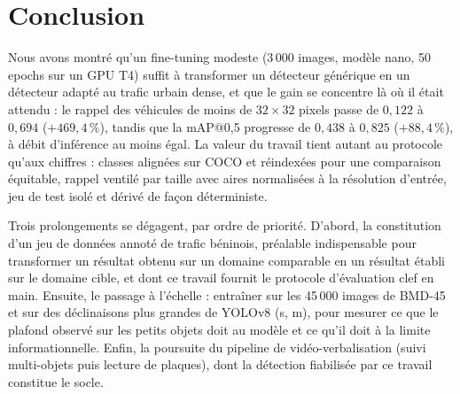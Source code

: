 \section{Conclusion}\label{sec-conclusion}

Nous avons montré qu'un fine-tuning modeste (3\,000 images, modèle
nano, 50 epochs sur un GPU T4) suffit à transformer un détecteur
générique en un détecteur adapté au trafic urbain dense, et que le gain
se concentre là où il était attendu : le rappel des véhicules de moins
de $32 \times 32$ pixels passe de $0{,}122$ à $0{,}694$
($+469{,}4\,\%$), tandis que la mAP@0,5 progresse de $0{,}438$ à
$0{,}825$ ($+88{,}4\,\%$), à débit d'inférence au moins égal. La valeur
du travail tient autant au protocole qu'aux chiffres : classes alignées
sur COCO et réindexées pour une comparaison équitable, rappel ventilé
par taille avec aires normalisées à la résolution d'entrée, jeu de test
isolé et dérivé de façon déterministe.

Trois prolongements se dégagent, par ordre de priorité. D'abord, la
constitution d'un jeu de données annoté de trafic béninois, préalable
indispensable pour transformer un résultat obtenu sur un domaine
comparable en un résultat établi sur le domaine cible, et dont ce
travail fournit le protocole d'évaluation clef en main. Ensuite, le
passage à l'échelle : entraîner sur les 45\,000 images de BMD-45 et sur
des déclinaisons plus grandes de YOLOv8 (s, m), pour mesurer ce que le
plafond observé sur les petits objets doit au modèle et ce qu'il doit à
la limite informationnelle. Enfin, la poursuite du pipeline de
vidéo-verbalisation (suivi multi-objets puis lecture de plaques), dont
la détection fiabilisée par ce travail constitue le socle.
